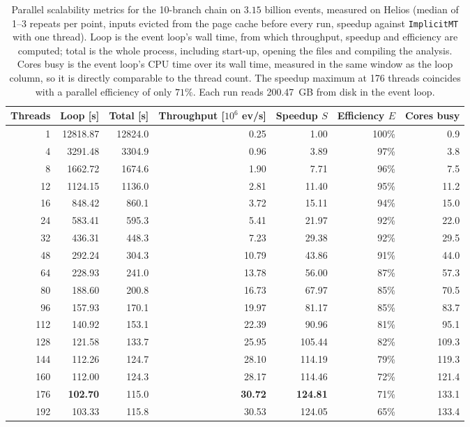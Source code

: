 \begin{table}[htbp]
\centering
\caption{Parallel scalability metrics for the 10-branch chain on $3.15$ billion events, measured on Helios (median of 1--3 repeats per point, inputs evicted from the page cache before every run, speedup against \texttt{ImplicitMT} with one thread). Loop is the event loop's wall time, from which throughput, speedup and efficiency are computed; total is the whole process, including start-up, opening the files and compiling the analysis. Cores busy is the event loop's CPU time over its wall time, measured in the same window as the loop column, so it is directly comparable to the thread count. The speedup maximum at 176 threads coincides with a parallel efficiency of only $71\%$. Each run reads 200.47~GB from disk in the event loop.}
\label{tab:scalability-chain11}
\setlength{\tabcolsep}{5pt}
\begin{tabular}{rrrrrrr}
\toprule
Threads & Loop [s] & Total [s] & Throughput [$10^6$ ev/s] & Speedup $S$ & Efficiency $E$ & Cores busy \\
\midrule
 1 & 12818.87 & 12824.0 & 0.25 & 1.00 & 100\% & 0.9 \\
 4 & 3291.48 & 3304.9 & 0.96 & 3.89 & 97\% & 3.8 \\
 8 & 1662.72 & 1674.6 & 1.90 & 7.71 & 96\% & 7.5 \\
12 & 1124.15 & 1136.0 & 2.81 & 11.40 & 95\% & 11.2 \\
16 & 848.42 & 860.1 & 3.72 & 15.11 & 94\% & 15.0 \\
24 & 583.41 & 595.3 & 5.41 & 21.97 & 92\% & 22.0 \\
32 & 436.31 & 448.3 & 7.23 & 29.38 & 92\% & 29.5 \\
48 & 292.24 & 304.3 & 10.79 & 43.86 & 91\% & 44.0 \\
64 & 228.93 & 241.0 & 13.78 & 56.00 & 87\% & 57.3 \\
80 & 188.60 & 200.8 & 16.73 & 67.97 & 85\% & 70.5 \\
96 & 157.93 & 170.1 & 19.97 & 81.17 & 85\% & 83.7 \\
112 & 140.92 & 153.1 & 22.39 & 90.96 & 81\% & 95.1 \\
128 & 121.58 & 133.7 & 25.95 & 105.44 & 82\% & 109.3 \\
144 & 112.26 & 124.7 & 28.10 & 114.19 & 79\% & 119.3 \\
160 & 112.00 & 124.3 & 28.17 & 114.46 & 72\% & 121.4 \\
176 & \textbf{102.70} & 115.0 & \textbf{30.72} & \textbf{124.81} & 71\% & 133.1 \\
192 & 103.33 & 115.8 & 30.53 & 124.05 & 65\% & 133.4 \\
\bottomrule
\end{tabular}
\end{table}

